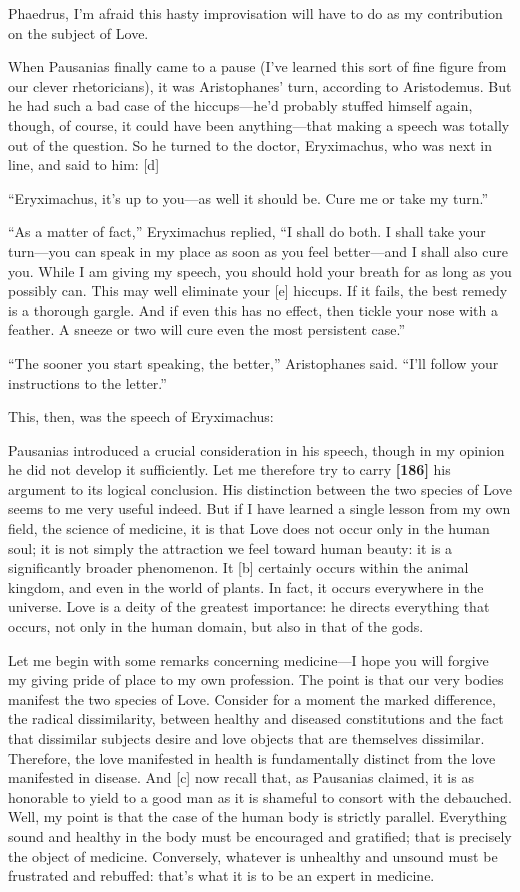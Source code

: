 Phaedrus, I'm afraid this hasty improvisation will have to do as my
contribution on the subject of Love.

When Pausanias finally came to a pause (I've learned this sort of fine
figure from our clever rhetoricians), it was Aristophanes' turn,
according to Aristodemus. But he had such a bad case of the
hiccups---he'd probably stuffed himself again, though, of course, it
could have been anything---that making a speech was totally out of the
question. So he turned to the doctor, Eryximachus, who was next in line,
and said to him: {[}d{]}

“Eryximachus, it's up to you---as well it should be. Cure me or take my
turn.”

“As a matter of fact,” Eryximachus replied, “I shall do both. I shall
take your turn---you can speak in my place as soon as you feel
better---and I shall also cure you. While I am giving my speech, you
should hold your breath for as long as you possibly can. This may well
eliminate your {[}e{]} hiccups. If it fails, the best remedy is a
thorough gargle. And if even this has no effect, then tickle your nose
with a feather. A sneeze or two will cure even the most persistent
case.”

“The sooner you start speaking, the better,” Aristophanes said. “I'll
follow your instructions to the letter.”

This, then, was the speech of Eryximachus:\crlf
\crlf

Pausanias introduced a crucial consideration in his speech, though in my
opinion he did not develop it sufficiently. Let me therefore try to
carry {\bf {[}186{]}} his argument to its logical conclusion. His
distinction between the two species of Love seems to me very useful
indeed. But if I have learned a single lesson from my own field, the
science of medicine, it is that Love does not occur only in the human
soul; it is not simply the attraction we feel toward human beauty: it is
a significantly broader phenomenon. It {[}b{]} certainly occurs within
the animal kingdom, and even in the world of plants. In fact, it occurs
everywhere in the universe. Love is a deity of the greatest importance:
he directs everything that occurs, not only in the human domain, but
also in that of the gods.

Let me begin with some remarks concerning medicine---I hope you will
forgive my giving pride of place to my own profession. The point is that
our very bodies manifest the two species of Love. Consider for a moment
the marked difference, the radical dissimilarity, between healthy and
diseased constitutions and the fact that dissimilar subjects desire and
love objects that are themselves dissimilar. Therefore, the love
manifested in health is fundamentally distinct from the love manifested
in disease. And {[}c{]} now recall that, as Pausanias claimed, it is as
honorable to yield to a good man as it is shameful to consort with the
debauched. Well, my point is that the case of the human body is strictly
parallel. Everything sound and healthy in the body must be encouraged
and gratified; that is precisely the object of medicine. Conversely,
whatever is unhealthy and unsound must be frustrated and rebuffed:
that's what it is to be an expert in medicine.

